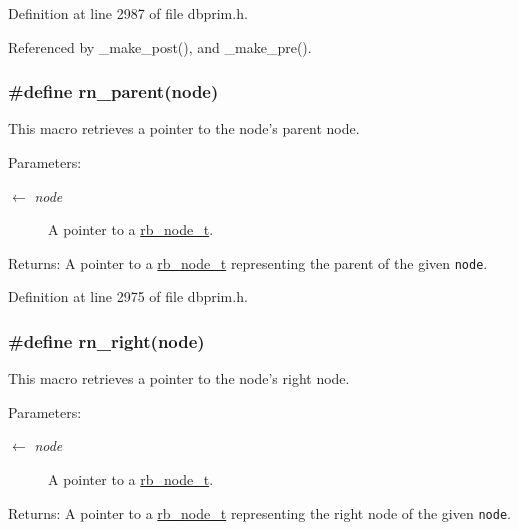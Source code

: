 Definition at line 2987 of file dbprim.h.

Referenced by \_\-make\_\-post(), and \_\-make\_\-pre().\hypertarget{group__dbprim__rbtree_ga34}{
\subsubsection[rn\_\-parent]{\setlength{\rightskip}{0pt plus 5cm}\#define rn\_\-parent(node)}}
\label{group__dbprim__rbtree_ga34}


This macro retrieves a pointer to the node's parent node.

\begin{Desc}
\item[Parameters:]
\begin{description}
\item[\mbox{$\leftarrow$} {\em node}]A pointer to a \hyperlink{group__dbprim__rbtree_ga1}{rb\_\-node\_\-t}.\end{description}
\end{Desc}
\begin{Desc}
\item[Returns:]A pointer to a \hyperlink{group__dbprim__rbtree_ga1}{rb\_\-node\_\-t} representing the parent of the given {\tt node}.\end{Desc}


Definition at line 2975 of file dbprim.h.\hypertarget{group__dbprim__rbtree_ga36}{
\subsubsection[rn\_\-right]{\setlength{\rightskip}{0pt plus 5cm}\#define rn\_\-right(node)}}
\label{group__dbprim__rbtree_ga36}


This macro retrieves a pointer to the node's right node.

\begin{Desc}
\item[Parameters:]
\begin{description}
\item[\mbox{$\leftarrow$} {\em node}]A pointer to a \hyperlink{group__dbprim__rbtree_ga1}{rb\_\-node\_\-t}.\end{description}
\end{Desc}
\begin{Desc}
\item[Returns:]A pointer to a \hyperlink{group__dbprim__rbtree_ga1}{rb\_\-node\_\-t} representing the right node of the given {\tt node}.\end{Desc}


